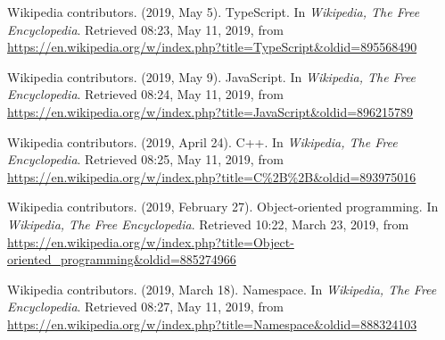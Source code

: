 \documentclass[a4paper]{report}
\begin{document}
\begin{thebibliography}{A}
Wikipedia contributors. (2019, May 5). TypeScript. In \emph{Wikipedia, The Free Encyclopedia}. Retrieved 08:23, May 11, 2019, from \url{https://en.wikipedia.org/w/index.php?title=TypeScript&oldid=895568490}

Wikipedia contributors. (2019, May 9). JavaScript. In \emph{Wikipedia, The Free Encyclopedia}. Retrieved 08:24, May 11, 2019, from \url{https://en.wikipedia.org/w/index.php?title=JavaScript&oldid=896215789}

Wikipedia contributors. (2019, April 24). C++. In \emph{Wikipedia, The Free Encyclopedia}. Retrieved 08:25, May 11, 2019, from \url{https://en.wikipedia.org/w/index.php?title=C%2B%2B&oldid=893975016}

Wikipedia contributors. (2019, February 27). Object-oriented programming. In \emph{Wikipedia, The Free Encyclopedia}. Retrieved 10:22, March 23, 2019, from \url{https://en.wikipedia.org/w/index.php?title=Object-oriented_programming&oldid=885274966}

Wikipedia contributors. (2019, March 18). Namespace. In \emph{Wikipedia, The Free Encyclopedia}. Retrieved 08:27, May 11, 2019, from \url{https://en.wikipedia.org/w/index.php?title=Namespace&oldid=888324103}
\end{thebibliography}
\end{document}

